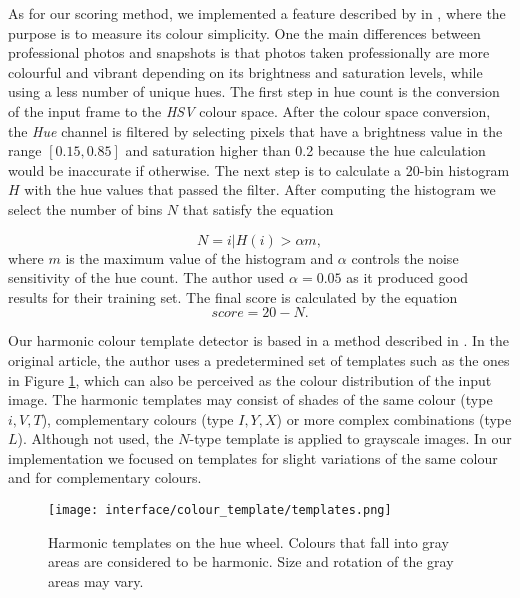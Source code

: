 As for our scoring method, we implemented a feature described by \citeauthor{ke2006design} in \cite{ke2006design}, where the purpose is to measure its colour simplicity. One the main differences between professional photos and snapshots is that photos taken professionally are more colourful and vibrant depending on its brightness and saturation levels, while using a less number of unique hues. The first step in hue count is the conversion of the input frame to the \emph{HSV} colour space. After the colour space conversion, the \emph{Hue} channel is filtered by selecting pixels that have a brightness value in the range $[0.15,0.85]$ and saturation higher than 0.2 because the hue calculation would be inaccurate if otherwise. The next step is to calculate a 20-bin histogram $H$ with the hue values that passed the filter. After computing the histogram we select the number of bins $N$ that satisfy the equation

\begin{equation}
N = {i | H(i) > \alpha m},
\end{equation}
where $m$ is the maximum value of the histogram and $\alpha$ controls the noise sensitivity of the hue count. The author used $\alpha = 0.05$ as it produced good results for their training set. The final score is calculated by the equation
\begin{equation}
score = 20 - N.
\end{equation}

Our harmonic colour template detector is based in a method described in \cite{cohen2006color}. In the original article, the author uses a predetermined set of templates such as the ones in Figure \ref{fig:templates}, which can also be perceived as the colour distribution of the input image. The harmonic templates may consist of shades of the same colour (type $i, V, T$), complementary colours (type $I, Y, X$) or more complex combinations (type $L$). Although not used, the $N$-type template is applied to grayscale images. In our implementation we focused on templates for slight variations of the same colour and for complementary colours.

\begin{figure}[htb]
	\centering
	\texttt{[image: interface/colour\_template/templates.png]}
  	\caption{Harmonic templates on the hue wheel. Colours that fall into gray areas are considered to be harmonic. Size and rotation of the gray areas may vary.}
	\label{fig:templates}
\end{figure}


